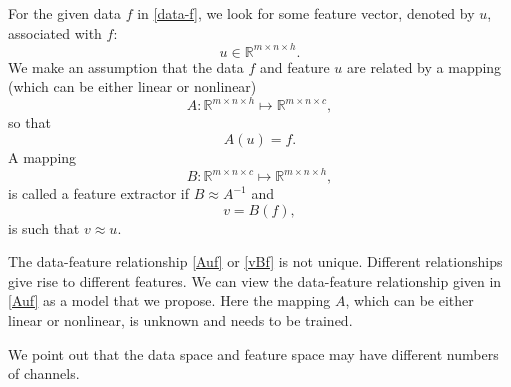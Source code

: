 For the given data $f$ in \eqref{data-f}, we look for some
feature vector, denoted by $u$,  associated with $f$:
\begin{equation}
\label{u}
u \in \mathbb{R}^{m \times n \times h}.
\end{equation}
We make an assumption that the data $f$ and feature $u$ are related by a mapping 
(which can be either linear or nonlinear)
\begin{equation}
\label{u}
A:  \mathbb{R}^{m \times n \times h}\mapsto \mathbb{R}^{m \times n \times c}, 
\end{equation}
so that
\begin{equation}
\label{Auf}
A(u)=f. 
\end{equation}
A mapping 
\begin{equation*}
B : \mathbb{R}^{m\times n\times c} \mapsto \mathbb{R}^{m \times n\times h},
\end{equation*}
is called a feature extractor if $B \approx A^{-1}$ and 
\begin{equation}\label{vBf}
v = B(f),
\end{equation}
is such that $v \approx u$.

The data-feature relationship \eqref{Auf} or \eqref{vBf} is not
unique.   Different relationships give rise to different features. 
We can view the data-feature relationship given in \eqref{Auf}
as a model that we propose.  Here the mapping $A$, which can be either
linear or nonlinear, is unknown and needs to be trained.  

We point out  that the data space and feature space may have different
numbers of channels.

